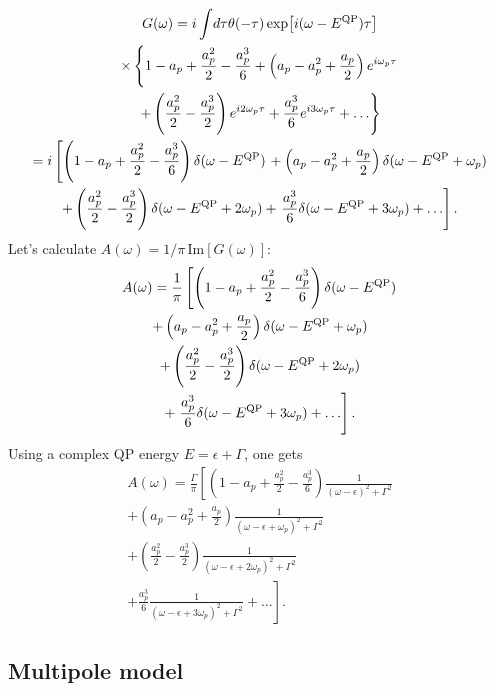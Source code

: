 \documentclass[a4paper,12pt]{article}
\renewcommand{\Im}{\,\mathrm{Im}}
\begin{document}
\begin{multline}
   {G} ( \omega ) =  i \int\!d\tau \theta ( -\tau ) 
  \exp\! \left[ i (\omega - E^\textnormal{QP} ) \tau \right] \\
 \times \left\{ 1 - a_p +\frac{a_p^2}2 -\frac{a_p^3}6 
   + \left( a_p - a_p^2 +\frac{a_p}2 \right) e^{i\omega_p \tau }   \right. \\
  \left.  + \left( \frac{a_p^2}2 - \frac{a_p^3}2 \right) e^{i 2 \omega_p \tau }
  + \frac{a_p^3}6 e^{ i 3 \omega_p \tau } 
  + \ldots  \right\} \\
 = i\left[ \left( 1 - a_p +\frac{a_p^2}2 -\frac{a_p^3}6 \right) \delta (\omega - E^\textnormal{QP} ) \right. 
  + \left( a_p - a_p^2 +\frac{a_p}2 \right) \delta (\omega - E^\textnormal{QP} +\omega_p )  \\ 
  +  \left( \frac{a_p^2}2 - \frac{a_p^3}2 \right) \delta (\omega - E^\textnormal{QP} + 2 \omega_p ) 
  + \left. \frac{a_p^3}6 \delta (\omega - E^\textnormal{QP} + 3 \omega_p )+ \ldots  \right] . 
\end{multline}
Let's calculate $A(\omega) = 1/\pi \Im[G(\omega)]$: 
\begin{multline}
   A ( \omega ) =  \frac1\pi \left[ \left( 1 - a_p +\frac{a_p^2}2 -\frac{a_p^3}6 \right) \delta (\omega - E^\textnormal{QP} ) \right. \\
  + \left( a_p - a_p^2 +\frac{a_p}2 \right) \delta (\omega - E^\textnormal{QP} +\omega_p )  \\ 
  +  \left( \frac{a_p^2}2 - \frac{a_p^3}2 \right) \delta (\omega - E^\textnormal{QP} + 2 \omega_p ) \\
  + \left. \frac{a_p^3}6 \delta (\omega - E^\textnormal{QP} + 3 \omega_p )+ \ldots  \right] .
\end{multline}
Using a complex QP energy $E=\epsilon+\Gamma$, one gets
\begin{multline}
   A ( \omega ) =  \frac\Gamma\pi \left[ \left( 1 - a_p +\frac{a_p^2}2 -\frac{a_p^3}6 \right) \frac1{(\omega - \epsilon )^2 + \Gamma^2} \right. \\
  + \left( a_p - a_p^2 +\frac{a_p}2 \right) \frac1{(\omega - \epsilon +\omega_p )^2 + \Gamma^2}  \\ 
  +  \left( \frac{a_p^2}2 - \frac{a_p^3}2 \right) \frac1{(\omega - \epsilon + 2\omega_p )^2 + \Gamma^2}  \\
  + \left. \frac{a_p^3}6 \frac1{(\omega - \epsilon + 3\omega_p )^2 + \Gamma^2} + \ldots  \right] .
\end{multline}

\subsection{Multipole model}
\end{document}

